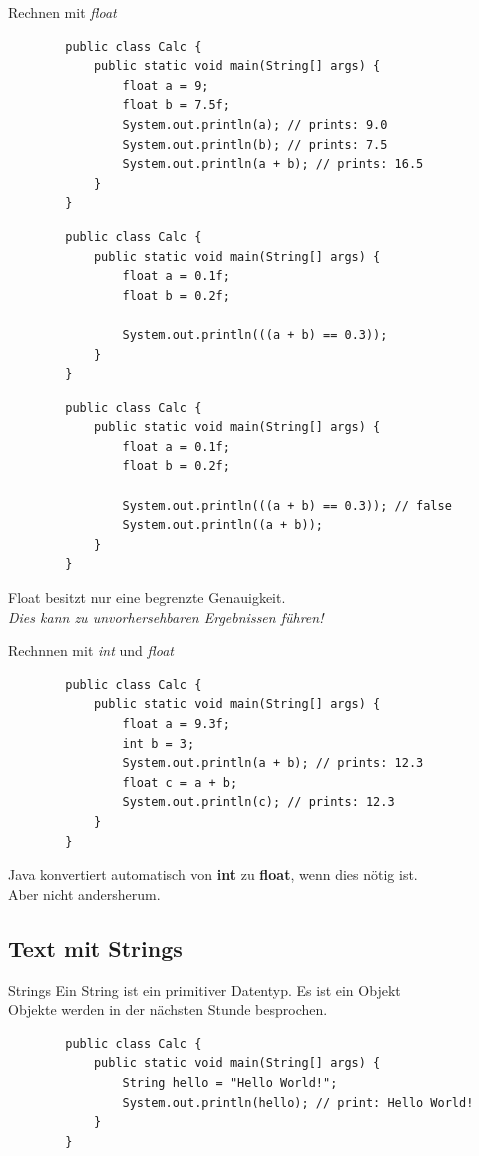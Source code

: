 \begin{frame}{Rechnen mit \emph{float}}
	\begin{lstlisting}
		public class Calc {
			public static void main(String[] args) {
				float a = 9;
				float b = 7.5f;
				System.out.println(a); // prints: 9.0
				System.out.println(b); // prints: 7.5
				System.out.println(a + b); // prints: 16.5
			}
		}
	\end{lstlisting}
	
	\framebreak
	\begin{lstlisting}
		public class Calc {
			public static void main(String[] args) {
				float a = 0.1f;
				float b = 0.2f;
				
				System.out.println(((a + b) == 0.3));
			}
		}
	\end{lstlisting}
	
	
	\framebreak
	\begin{lstlisting}
		public class Calc {
			public static void main(String[] args) {
				float a = 0.1f;
				float b = 0.2f;
				
				System.out.println(((a + b) == 0.3)); // false
				System.out.println((a + b));
			}
		}
	\end{lstlisting}
	Float besitzt nur eine begrenzte Genauigkeit. \\
	\emph{Dies kann zu unvorhersehbaren Ergebnissen führen!}
\end{frame}

\begin{frame}[fragile]{Rechnnen mit \emph{int} und \emph{float}}
	\begin{lstlisting}
		public class Calc {
			public static void main(String[] args) {
				float a = 9.3f;
				int b = 3;
				System.out.println(a + b); // prints: 12.3
				float c = a + b;
				System.out.println(c); // prints: 12.3
			}
		}
	\end{lstlisting}
	Java konvertiert automatisch von \textbf{int} zu \textbf{float}, wenn dies nötig ist. \\
	Aber nicht andersherum.
\end{frame}

\subsection{Text mit Strings}

\begin{frame}[fragile]{Strings}
	Ein String ist ein primitiver Datentyp. Es ist ein Objekt \\
	Objekte werden in der nächsten Stunde besprochen.
	\begin{lstlisting}
		public class Calc {
			public static void main(String[] args) {
				String hello = "Hello World!";
				System.out.println(hello); // print: Hello World!
			}
		}
	\end{lstlisting}
\end{frame}


